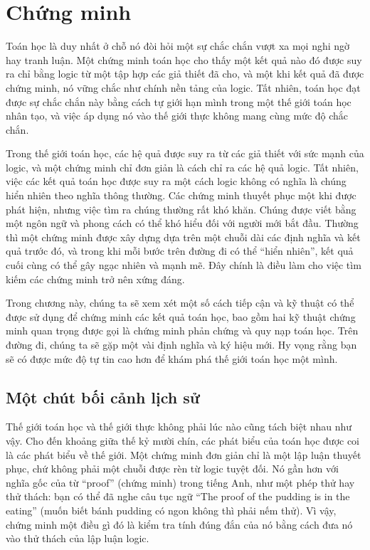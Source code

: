 \chapter{Chứng minh}

Toán học là duy nhất ở chỗ nó đòi hỏi một sự chắc chắn vượt xa mọi nghi ngờ hay tranh luận. Một chứng minh toán học cho thấy một kết quả nào đó được suy ra chỉ bằng logic từ một tập hợp các giả thiết đã cho, và một khi kết quả đã được chứng minh, nó vững chắc như chính nền tảng của logic. Tất nhiên, toán học đạt được sự chắc chắn này bằng cách tự giới hạn mình trong một thế giới toán học nhân tạo, và việc áp dụng nó vào thế giới thực không mang cùng mức độ chắc chắn.

Trong thế giới toán học, các hệ quả được suy ra từ các giả thiết với sức mạnh của logic, và một chứng minh chỉ đơn giản là cách chỉ ra các hệ quả logic. Tất nhiên, việc các kết quả toán học được suy ra một cách logic không có nghĩa là chúng hiển nhiên theo nghĩa thông thường. Các chứng minh thuyết phục một khi được phát hiện, nhưng việc tìm ra chúng thường rất khó khăn. Chúng được viết bằng một ngôn ngữ và phong cách có thể khó hiểu đối với người mới bắt đầu. Thường thì một chứng minh được xây dựng dựa trên một chuỗi dài các định nghĩa và kết quả trước đó, và trong khi mỗi bước trên đường đi có thể ``hiển nhiên'', kết quả cuối cùng có thể gây ngạc nhiên và mạnh mẽ. Đây chính là điều làm cho việc tìm kiếm các chứng minh trở nên xứng đáng.

Trong chương này, chúng ta sẽ xem xét một số cách tiếp cận và kỹ thuật có thể được sử dụng để chứng minh các kết quả toán học, bao gồm hai kỹ thuật chứng minh quan trọng được gọi là chứng minh phản chứng và quy nạp toán học. Trên đường đi, chúng ta sẽ gặp một vài định nghĩa và ký hiệu mới. Hy vọng rằng bạn sẽ có được mức độ tự tin cao hơn để khám phá thế giới toán học một mình.

\section{Một chút bối cảnh lịch sử}

Thế giới toán học và thế giới thực không phải lúc nào cũng tách biệt nhau như vậy. Cho đến khoảng giữa thế kỷ mười chín, các phát biểu của toán học được coi là các phát biểu về thế giới. Một chứng minh đơn giản chỉ là một lập luận thuyết phục, chứ không phải một chuỗi được rèn từ logic tuyệt đối. Nó gần hơn với nghĩa gốc của từ ``proof'' (chứng minh) trong tiếng Anh, như một phép thử hay thử thách: bạn có thể đã nghe câu tục ngữ ``The proof of the pudding is in the eating'' (muốn biết bánh pudding có ngon không thì phải nếm thử). Vì vậy, chứng minh một điều gì đó là kiểm tra tính đúng đắn của nó bằng cách đưa nó vào thử thách của lập luận logic.

